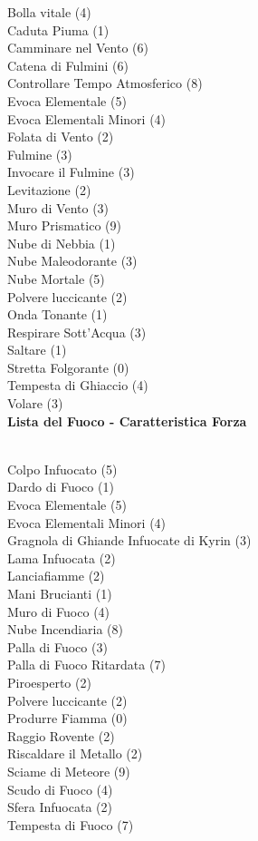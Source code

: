 \begin{multicols}{3}
{	
	Bolla vitale (4)\\
	Caduta Piuma (1)\\
	Camminare nel Vento (6)\\
	Catena di Fulmini (6)\\
	Controllare Tempo Atmosferico (8)\\
	Evoca Elementale (5)\\
	Evoca Elementali Minori (4)\\
	Folata di Vento (2)\\
	Fulmine (3)\\
	Invocare il Fulmine (3)\\
	Levitazione (2)\\
	Muro di Vento (3)\\
	Muro Prismatico (9)\\
	Nube di Nebbia (1)\\
	Nube Maleodorante (3)\\
	Nube Mortale (5)\\
	Polvere luccicante (2)\\
	Onda Tonante (1)\\
	Respirare Sott'Acqua (3)\\
	Saltare (1)\\
	Stretta Folgorante (0)\\
	Tempesta di Ghiaccio (4)\\
	Volare (3)\\

	\medskip\textbf{Lista del Fuoco - Caratteristica Forza}

	\\
	Colpo Infuocato (5)\\
	Dardo di Fuoco (1)\\
	Evoca Elementale (5)\\
	Evoca Elementali Minori (4)\\
	Gragnola di Ghiande Infuocate di Kyrin (3)\\
	Lama Infuocata (2)\\
	Lanciafiamme (2)\\
	Mani Brucianti (1)\\
	Muro di Fuoco (4)\\
	Nube Incendiaria (8)\\
	Palla di Fuoco (3)\\
	Palla di Fuoco Ritardata (7)\\
	Piroesperto (2)\\
	Polvere luccicante (2)\\
	Produrre Fiamma (0)\\
	Raggio Rovente (2)\\
	Riscaldare il Metallo (2)\\
	Sciame di Meteore (9)\\
	Scudo di Fuoco (4)\\
	Sfera Infuocata (2)\\
	Tempesta di Fuoco (7)\\

}
\end{multicols}
